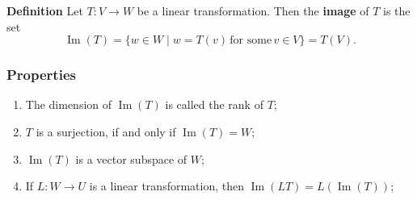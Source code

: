 \documentclass[12pt]{article}
\begin{document}
{\bf Definition} 
Let $T:V\to W$ be a linear transformation. Then the {\bf image} of
$T$ is the set
$$ \operatorname{Im} (T) = \{ w\in W \mid w=T(v) \,\mbox{for some}\, v\in V\} = T(V).$$

\subsubsection{Properties}
\begin{enumerate}
\item The dimension of $\operatorname{Im}(T)$ is called the rank of $T$;
\item $T$ is a surjection, if and only if  $\operatorname{Im}(T)=W$;
\item $\operatorname{Im}(T)$ is a vector subspace of $W$;
\item If $L\colon W\to U$ is a linear transformation, then $\operatorname{Im}(LT) =L(\operatorname{Im}(T))$;
\end{enumerate}
\end{document}
